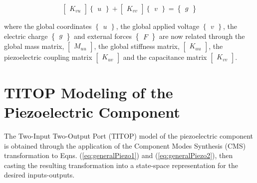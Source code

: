 \documentclass{ifacconf}
\begin{document}
\begin{equation}
\label{eq:generalPiezo2}
\begin{bmatrix} K_{v u} \end{bmatrix} \begin{Bmatrix} u \end{Bmatrix} + \begin{bmatrix} K_{vv} \end{bmatrix} \begin{Bmatrix} v \end{Bmatrix} = \begin{Bmatrix} g \end{Bmatrix}
\end{equation}

where the global coordinates $\begin{Bmatrix} u \end{Bmatrix}$, the global applied voltage $\begin{Bmatrix} v \end{Bmatrix}$, the electric charge $\begin{Bmatrix} g \end{Bmatrix}$ and external forces $\begin{Bmatrix} F \end{Bmatrix}$ are now related through the global  mass matrix, $\begin{bmatrix} M_{uu} \end{bmatrix}$, the global stiffness matrix, $\begin{bmatrix} K_{uu} \end{bmatrix}$, the piezoelectric coupling matrix $\begin{bmatrix} K_{uv} \end{bmatrix}$ and the capacitance matrix $\begin{bmatrix} K_{vv} \end{bmatrix}$.

\section{TITOP Modeling of the Piezoelectric Component}
\label{sec:TITOPmodeling}

The Two-Input Two-Output Port (TITOP) model of the piezoelectric component is obtained through the application of the Component Modes Synthesis (CMS) transformation to Eqns. (\ref{eq:generalPiezo1}) and (\ref{eq:generalPiezo2}), then casting the resulting transformation into a state-space representation for the desired inputs-outputs.
\end{document}

